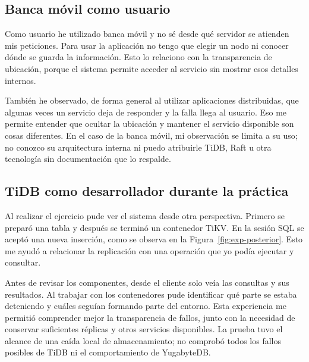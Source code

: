 \subsection{Banca móvil como usuario}
Como usuario he utilizado banca móvil y no sé desde qué servidor se atienden mis peticiones. Para usar la aplicación no tengo que elegir un nodo ni conocer dónde se guarda la información. Esto lo relaciono con la transparencia de ubicación, porque el sistema permite acceder al servicio sin mostrar esos detalles internos.

También he observado, de forma general al utilizar aplicaciones distribuidas, que algunas veces un servicio deja de responder y la falla llega al usuario. Eso me permite entender que ocultar la ubicación y mantener el servicio disponible son cosas diferentes. En el caso de la banca móvil, mi observación se limita a su uso; no conozco su arquitectura interna ni puedo atribuirle TiDB, Raft u otra tecnología sin documentación que lo respalde.

\subsection{TiDB como desarrollador durante la práctica}
Al realizar el ejercicio pude ver el sistema desde otra perspectiva. Primero se preparó una tabla y después se terminó un contenedor TiKV. En la sesión SQL se aceptó una nueva inserción, como se observa en la Figura~\ref{fig:exp-posterior}. Esto me ayudó a relacionar la replicación con una operación que yo podía ejecutar y consultar.

Antes de revisar los componentes, desde el cliente solo veía las consultas y sus resultados. Al trabajar con los contenedores pude identificar qué parte se estaba deteniendo y cuáles seguían formando parte del entorno. Esta experiencia me permitió comprender mejor la transparencia de fallos, junto con la necesidad de conservar suficientes réplicas y otros servicios disponibles. La prueba tuvo el alcance de una caída local de almacenamiento; no comprobó todos los fallos posibles de TiDB ni el comportamiento de YugabyteDB.
